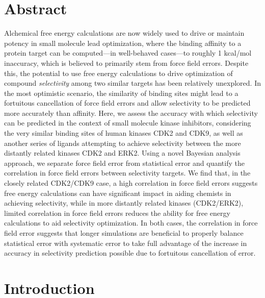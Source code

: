 \documentclass[phd,tocprelim]{cornell}
\begin{document}
\realdoublespacing
\section{Abstract}
Alchemical free energy calculations are now widely used to drive or maintain potency in small molecule lead optimization, where the binding affinity to a protein target can be computed---in well-behaved cases---to roughly 1 kcal/mol inaccuracy, which is believed to primarily stem from force field errors.
Despite this, the potential to use free energy calculations to drive optimization of compound \emph{selectivity} among two similar targets has been relatively unexplored.
In the most optimistic scenario, the similarity of binding sites might lead to a fortuitous cancellation of force field errors and allow selectivity to be predicted more accurately than affinity.
Here, we assess the accuracy with which selectivity can be predicted in the context of small molecule kinase inhibitors, considering the very similar binding sites of human kinases CDK2 and CDK9, as well as another series of ligands attempting to achieve selectivity between the more distantly related kinases CDK2 and ERK2.
Using a novel Bayesian analysis approach, we separate force field error from statistical error and quantify the correlation in force field errors between selectivity targets.
We find that, in the closely related CDK2/CDK9 case, a high correlation in force field errors suggests free energy calculations can have significant impact in aiding chemists in achieving selectivity, while in more distantly related kinases (CDK2/ERK2), limited correlation in force field errors reduces the ability for free energy calculations to aid selectivity optimization.
In both cases, the correlation in force field error suggests that longer simulations are beneficial to properly balance statistical error with systematic error to take full advantage of the increase in accuracy in selectivity prediction possible due to fortuitous cancellation of error.

\section{Introduction}
\end{document}
